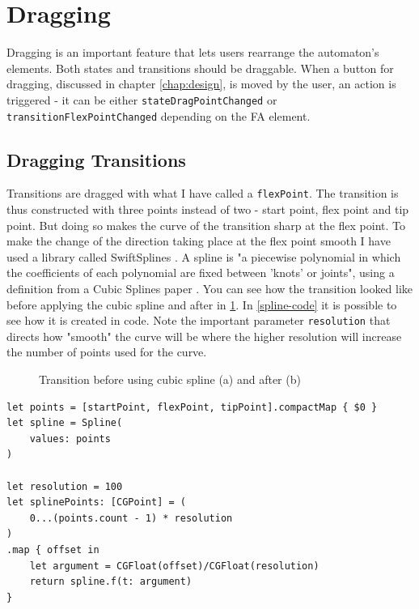 \section{Dragging}

Dragging is an important feature that lets users rearrange the automaton's elements. Both states and transitions should be draggable. When a button for dragging, discussed in chapter \ref{chap:design}, is moved by the user, an action is triggered - it can be either \lstinline{stateDragPointChanged} or \lstinline{transitionFlexPointChanged} depending on the FA element.

\subsection{Dragging Transitions}

Transitions are dragged with what I have called a \lstinline{flexPoint}. The transition is thus constructed with three points instead of two - start point, flex point and tip point. But doing so makes the curve of the transition sharp at the flex point. To make the change of the direction taking place at the flex point smooth I have used a library called SwiftSplines \cite{swiftsplines}. A spline is "a piecewise polynomial in which the coefficients of each polynomial are fixed between 'knots' or joints", using a definition from a Cubic Splines paper \cite{cubic-splines}. You can see how the transition looked like before applying the cubic spline and after in \ref{spline}. In \ref{spline-code} it is possible to see how it is created in code. Note the important parameter \lstinline{resolution} that directs how "smooth" the curve will be where the higher resolution will increase the number of points used for the curve.

\begin{figure}
    \centering
    \caption{Transition before using cubic spline (a) and after (b)}\label{spline}
\end{figure}

\begin{lstlisting}[caption={Creating spline points}, label=spline-code]
let points = [startPoint, flexPoint, tipPoint].compactMap { $0 }
let spline = Spline(
    values: points
)

let resolution = 100
let splinePoints: [CGPoint] = (
    0...(points.count - 1) * resolution
)
.map { offset in
    let argument = CGFloat(offset)/CGFloat(resolution)
    return spline.f(t: argument)
}
\end{lstlisting}

